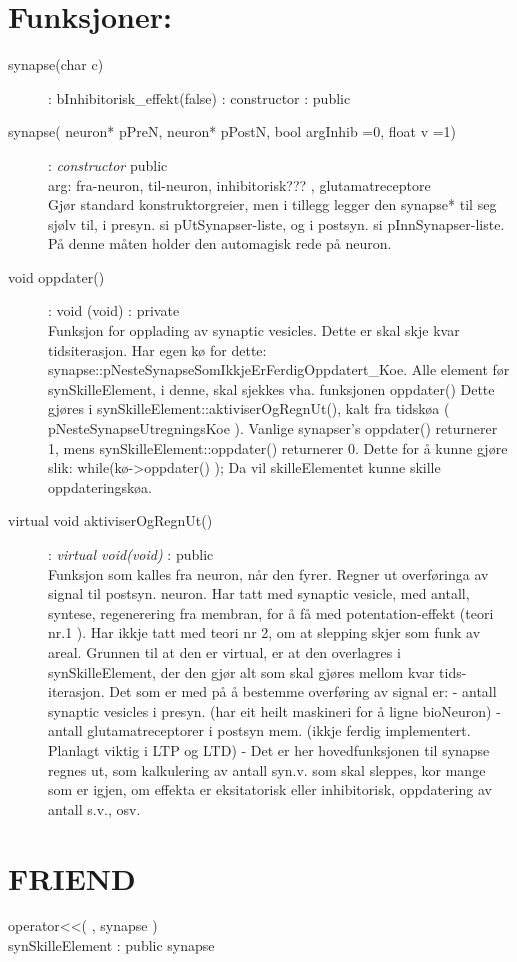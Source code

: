 	\section{Funksjoner:}
	\begin{description} 
	 	\item[synapse(char c)] : bInhibitorisk\_effekt(false)  	: 	constructor 	:  	public \\

	 	\item[synapse( neuron* pPreN, neuron* pPostN, bool argInhib =0, float v =1)] 	: \textit{constructor} 	public \\
 		arg:        fra-neuron,     til-neuron, inhibitorisk??? , glutamatreceptore \\
		Gjør standard konstruktorgreier, men i tillegg legger den synapse* til seg sjølv til, i presyn. si pUtSynapser-liste, og i postsyn. si 
		pInnSynapser-liste. På denne måten holder den automagisk rede på neuron. 
	
		\item[void oppdater()] 		: 	void (void) 	: 	private\\
		Funksjon for opplading av synaptic vesicles. Dette er skal skje kvar tidsiterasjon. Har egen kø for dette: 
		synapse::pNesteSynapseSomIkkjeErFerdigOppdatert\_Koe. Alle element før synSkilleElement, i denne, skal sjekkes vha. funksjonen oppdater() 
		Dette gjøres i synSkilleElement::aktiviserOgRegnUt(), kalt fra tidskøa ( pNesteSynapseUtregningsKoe ).
		Vanlige synapser's oppdater() returnerer 1, mens synSkilleElement::oppdater() returnerer 0. Dette for å kunne gjøre slik: 
		while(kø->oppdater() ); Da vil skilleElementet kunne skille oppdateringskøa.

		\item[virtual void aktiviserOgRegnUt()] : 	\textit{virtual void(void)} : 	public \\
		Funksjon som kalles fra neuron, når den fyrer. Regner ut overføringa av signal til postsyn. neuron. Har tatt med synaptic vesicle, med 
		antall, syntese, regenerering fra membran, for å få med potentation-effekt (teori nr.1 ). Har ikkje tatt med teori nr 2, om at slepping
		skjer som funk av areal.
		Grunnen til at den er virtual, er at den overlagres i synSkilleElement, der den gjør alt som skal gjøres mellom kvar tids-iterasjon.
		Det som er med på å bestemme overføring av signal er:
			- antall synaptic vesicles i presyn. (har eit heilt maskineri for å ligne bioNeuron)
			- antall glutamatreceptorer i postsyn mem. (ikkje ferdig implementert. Planlagt viktig i LTP og LTD)
		- Det er her hovedfunksjonen til synapse regnes ut, som kalkulering av antall syn.v. som skal sleppes, kor mange som er igjen, om effekta er
		eksitatorisk eller inhibitorisk, oppdatering av antall s.v., osv.
	\end{description}




	\section{FRIEND}
		\begin{description}
			\item[operator<<( , synapse )]
			\item[synSkilleElement : public synapse]
		\end{description}
	
